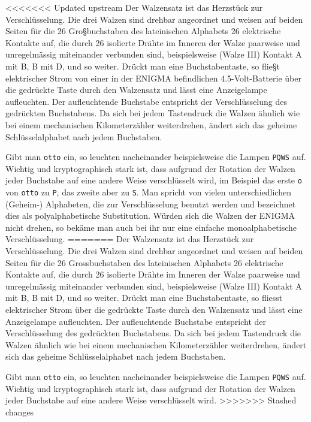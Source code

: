 \documentclass[%
<<<<<<< Updated upstream
11pt,%
twoside,%
titlepage,%
german,%
headsepline%
]{scrartcl}
\begin{document}
<<<<<<< Updated upstream
Der Walzensatz ist das Herzstück zur Verschlüsselung. Die drei Walzen sind drehbar angeordnet und weisen auf beiden Seiten für die 26 Gro§buchstaben des lateinischen Alphabets 26 elektrische Kontakte auf, die durch 26 isolierte Drähte im Inneren der Walze paarweise und unregelmässig miteinander verbunden sind, beispielsweise (Walze III) Kontakt A mit B, B mit D, und so weiter. Drückt man eine Buchstabentaste, so flie§t elektrischer Strom von einer in der ENIGMA befindlichen 4.5-Volt-Batterie über die gedrückte Taste durch den Walzensatz und lässt eine Anzeigelampe aufleuchten. Der aufleuchtende Buchstabe entspricht der Verschlüsselung des gedrückten Buchstabens. Da sich bei jedem Tastendruck die Walzen ähnlich wie bei einem mechanischen Kilometerzähler weiterdrehen, ändert sich das geheime Schlüsselalphabet nach jedem Buchstaben.

Gibt man \texttt{otto} ein, so leuchten nacheinander beispielsweise die Lampen \texttt{PQWS} auf. Wichtig und kryptographisch stark ist, dass aufgrund der Rotation der Walzen jeder Buchstabe auf eine andere Weise verschlüsselt wird, im Beispiel das erste \texttt{o} von \texttt{otto} zu \texttt{P}, das zweite aber zu \texttt{S}. Man spricht von vielen unterschiedlichen (Geheim-) Alphabeten, die zur Verschlüsselung benutzt werden und bezeichnet dies als polyalphabetische Substitution. Würden sich die Walzen der ENIGMA nicht drehen, so bekäme man auch bei ihr nur eine einfache monoalphabetische Verschlüsselung.
=======
Der Walzensatz ist das Herzstück zur Verschlüsselung. Die drei Walzen sind drehbar angeordnet und weisen auf beiden Seiten für die 26 Grossbuchstaben des lateinischen Alphabets 26 elektrische Kontakte auf, die durch 26 isolierte Drähte im Inneren der Walze paarweise und unregelmässig miteinander verbunden sind, beispielsweise (Walze III) Kontakt A mit B, B mit D, und so weiter. Drückt man eine Buchstabentaste, so fliesst elektrischer Strom über die gedrückte Taste durch den Walzensatz und lässt eine Anzeigelampe aufleuchten. Der aufleuchtende Buchstabe entspricht der Verschlüsselung des gedrückten Buchstabens. Da sich bei jedem Tastendruck die Walzen ähnlich wie bei einem mechanischen Kilometerzähler weiterdrehen, ändert sich das geheime Schlüsselalphabet nach jedem Buchstaben.

Gibt man \texttt{otto} ein, so leuchten nacheinander beispielsweise die Lampen \texttt{PQWS} auf. Wichtig und kryptographisch stark ist, dass aufgrund der Rotation der Walzen jeder Buchstabe auf eine andere Weise verschlüsselt wird.
>>>>>>> Stashed changes
\end{document}
